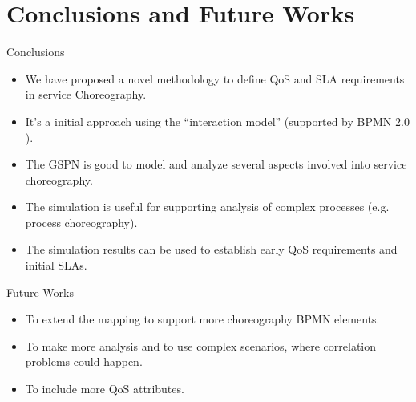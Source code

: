 \documentclass[xcolor=svgnames]{beamer}
\begin{document}
\section{Conclusions and Future Works}
   \begin{frame}{Conclusions}
       \begin{itemize}
         \item <1->  We have proposed a novel methodology to define  QoS and SLA requirements in service Choreography.
         \item <2-> It's a  initial approach using the ``interaction model'' (supported by BPMN $2.0$).
         \item <3-> The GSPN is good to model and analyze several aspects involved into service choreography.
         \item <4-> The simulation is useful for supporting analysis of complex processes (e.g. process choreography).
     	 \item <5-> The simulation results can be used to establish early QoS requirements and initial SLAs.
       \end{itemize}
   \end{frame}


  \begin{frame}{Future Works}
       \begin{itemize}
         \item To extend the mapping to support more choreography BPMN elements.
         \item To make more analysis and to use complex scenarios, where correlation problems could happen.
         \item To include more QoS attributes.

       \end{itemize}
   \end{frame}
\end{document}
